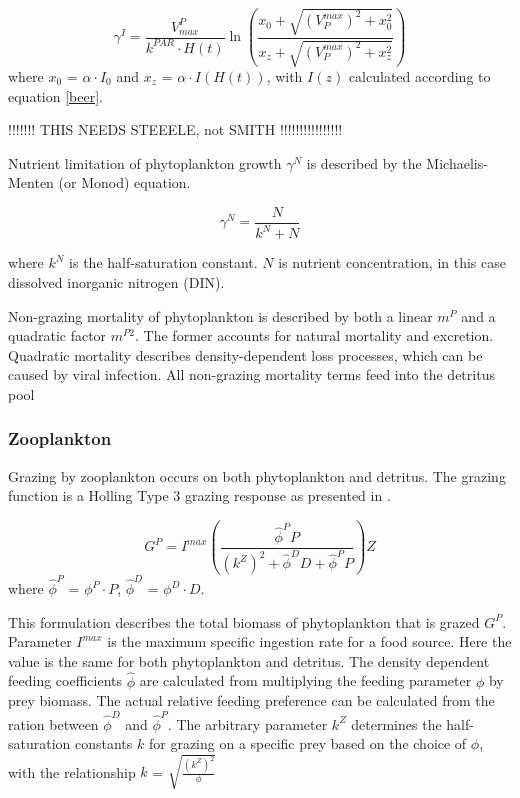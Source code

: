 \documentclass[template.tex]{subfiles}
\begin{document}
\begin{equation}
    \gamma^I = \frac{V^P_{max}}{k^{PAR} \cdot H(t)} \ln{ \left( \frac{ x_0+\sqrt{(V^{max}_P)^2+x_0^2} }{ x_z+\sqrt{(V^{max}_P)^2+x_z^2} } \right)}
\end{equation}
where $x_0$ = $\alpha \cdot I_0$ and $x_z$ = $\alpha \cdot I(H(t))$, with $I(z)$ calculated according to equation \eqref{beer}.

!!!!!!! THIS NEEDS STEEELE, not SMITH !!!!!!!!!!!!!!!!

Nutrient limitation of phytoplankton growth $\gamma^N$ is described by the Michaelis-Menten (or Monod) equation.

\begin{equation}
    \gamma^N = \frac{N}{k^N + N}
\end{equation}

where $k^N$ is the half-saturation constant. $N$ is nutrient concentration, in this case dissolved inorganic nitrogen (DIN).

Non-grazing mortality of phytoplankton is described by both a linear $m^P$ and a quadratic factor $m^{P2}$. The former accounts for natural mortality and excretion. Quadratic mortality describes density-dependent loss processes, which can be caused by viral infection. All non-grazing mortality terms feed into the detritus pool

\subsubsection{Zooplankton}
Grazing by zooplankton occurs on both phytoplankton and detritus. The grazing function is a Holling Type 3 grazing response as presented in \citet{Anderson2015c}.

\begin{equation}
    G^P = I^{max} \left( \frac{ \hat{\phi}^P P}{(k^Z)^2 + \hat{\phi}^D D +\hat{\phi}^P P}  \right) Z
\end{equation}
where $\hat{\phi}^P$ = $\phi^P \cdot P$, $\hat{\phi}^D$ = $\phi^D \cdot D$.

This formulation describes the total biomass of phytoplankton that is grazed $G^P$. Parameter $I^{max}$ is the maximum specific ingestion rate for a food source. Here the value is the same for both phytoplankton and detritus. The density dependent feeding coefficients $\hat{\phi}$ are calculated from multiplying the feeding parameter $\phi$ by prey biomass. The actual relative feeding preference can be calculated from the ration between $\hat{\phi}^D$ and $\hat{\phi}^P$. The arbitrary parameter $k^Z$ determines the half-saturation constants $k$ for grazing on a specific prey based on the choice of $\phi$, with the relationship $k$ = $\sqrt{\frac{(k^Z)^2 }{ \phi}}$
\end{document}

